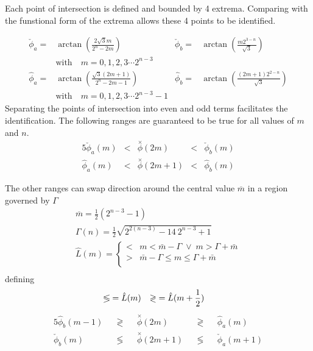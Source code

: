 Each point of intersection is defined and bounded by 4 extrema. Comparing with the funstional form of the extrema allows these 4 points to be identified.

\begin{align*}
 \check{\phi}_{a} = & \arctan\left(\frac{2 \sqrt{3} m}{2^n - 2 m}\right) &
 \check{\phi}_{b} = & \arctan\left(\frac{m 2^{3-n}}{\sqrt{3}}       \right) \\ 
 & \text{with}\quad   m =  0,1,2,3 \cdots2^{n-3} \\
 \hat{\phi    }_{a}  = & \arctan\left(\frac{\sqrt{3} (2 m+1)}{2^n-2 m-1}  \right) &
 \hat{\phi   }_{b}  = & \arctan\left(\frac{(2 m+1) 2^{2-n}}{\sqrt{3}}          \right) \\
 &\text{with}\quad   m =  0,1,2,3 \cdots2^{n-3}-1 
\end{align*}
Separating the points of intersection into even and odd terms facilitates the identification. The following ranges are guaranteed to be true for all values of $m$ and $n$.
\begin{alignat*}{5}
 \check{\phi}_{a} (m) & < & \overset{\times}{\phi} (2m)      & < & \check{\phi}_{b}(m)  \\
      \hat{\phi}_{a}(m) & < &  \overset{\times}{\phi} (2m+1) & < &     \hat{\phi}_{b}(m)  
\end{alignat*}

The other ranges can swap direction around the central value  $\overline{m}$ in a region governed by $\Gamma$
\begin{gather*}
\overline{m}=\frac{1}{2} \left(2^{n-3}-1\right) \\
\varGamma(n)=\frac{1}{2} \sqrt{2^{2 (n-3)}-14\ 2^{n-3}+1} \\
\hat{L}(m)=\begin{cases}
< & m < \bar{m}-\Gamma \; \vee  \; m > \Gamma +\bar{m} \\
> & \bar{m}-\Gamma \leq m \leq \Gamma +\bar{m}\\
\end{cases} \\
\end{gather*}
defining
\begin{align}
\lessgtr &= \hat{L}(\scriptsize{m})  & \gtrless &= \hat{L}(\scriptsize{m+\frac{1}{2}})
\end{align}
\begin{alignat*}{5}
 \hat{\phi}_{b}(m-1) && \gtrless  && \overset{\times}{\phi} (2m)       &&\gtrless  &&     \hat{\phi}_{a}(m)  \\
 \check{\phi}_{b}(m)  && \lessgtr                   && \overset{\times}{\phi} (2m+1)  && \lessgtr                  &&\check{\phi}_{a} (m+1) 
\end{alignat*}


